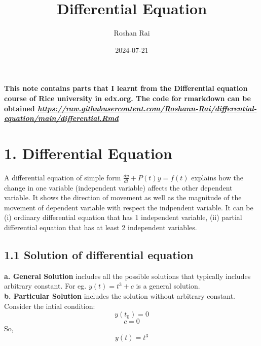 \documentclass[
  11pt,
]{article}
\title{Differential Equation}
\author{Roshan Rai}
\date{2024-07-21}
\begin{document}
\maketitle

\onehalfspacing

\textbf{This note contains parts that I learnt from the Differential
equation course of Rice university in edx.org. The code for rmarkdown
can be obtained
\href{https://raw.githubusercontent.com/Roshann-Rai/differential-equation/main/differential.Rmd}{\emph{https://raw.githubusercontent.com/Roshann-Rai/differential-equation/main/differential.Rmd}}}

\section{1. Differential Equation}\label{differential-equation}

A differential equation of simple form \(\frac{dy}{dt} + P(t)y = f(t)\)
explains how the change in one variable (independent variable) affects
the other dependent variable. It shows the direction of movement as well
as the magnitude of the movement of dependent variable with respect the
indpendent variable. It can be (i) ordinary differential equation that
has 1 independent variable, (ii) partial differential equation that has
at least 2 independent variables.

\subsection{1.1 Solution of differential
equation}\label{solution-of-differential-equation}

\textbf{a. General Solution} includes all the possible solutions that
typically includes arbitrary constant. For eg. \(y(t) = t^3 + c\) is a
general solution.\\
\textbf{b. Particular Solution} includes the solution without arbitrary
constant. Consider the intial condition: \[y(t_0) = 0\] \[c = 0\] So,
\[y(t) = t^3\] \clearpage
\end{document}
